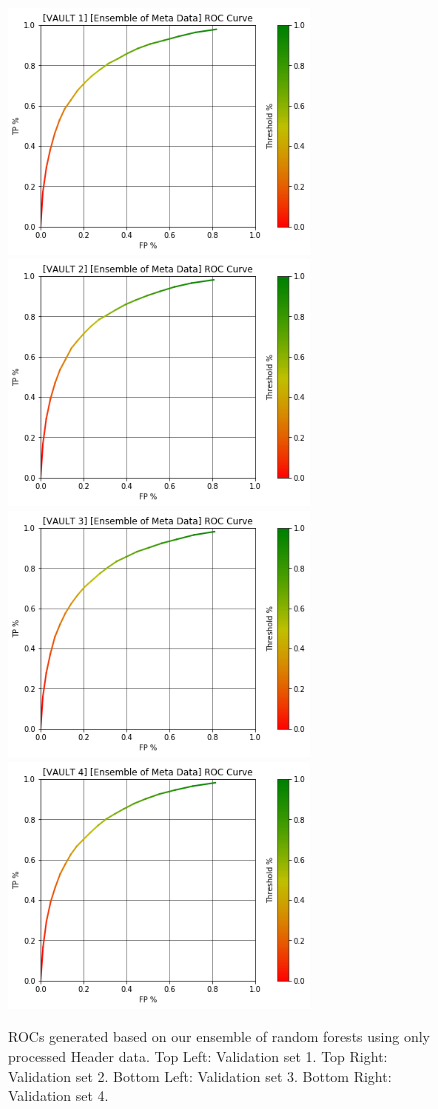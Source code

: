 \begin{figure}[h]
\centering
\includegraphics[width=8cm]{body/results/Graphs/JustMeta/2.MetaEnsemble/v1.png}
\includegraphics[width=8cm]{body/results/Graphs/JustMeta/2.MetaEnsemble/v2.png}
\includegraphics[width=8cm]{body/results/Graphs/JustMeta/2.MetaEnsemble/v3.png}
\includegraphics[width=8cm]{body/results/Graphs/JustMeta/2.MetaEnsemble/v4.png}
\caption{ROCs generated based on our ensemble of random forests using only processed Header data. Top Left: Validation set 1. Top Right: Validation set 2. Bottom Left: Validation set 3. Bottom Right: Validation set 4.}
\label{fig:metaonly}
\end{figure}

